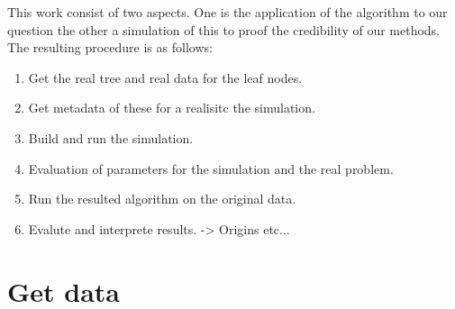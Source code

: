   This work consist of two aspects. One is the application of the algorithm to our question the
    other a simulation of this to proof the credibility of our methods. \\
  The resulting procedure is as follows:
  \begin{enumerate}
    \item Get the real tree and real data for the leaf nodes.
    \item Get metadata of these for a realisitc the simulation.
    \item Build and run the simulation.
    \item Evaluation of parameters for the simulation and the real problem.
    \item Run the resulted algorithm on the original data.
    \item Evalute and interprete results. -> Origins etc...
  \end{enumerate}
  

  
  \section{Get data}
